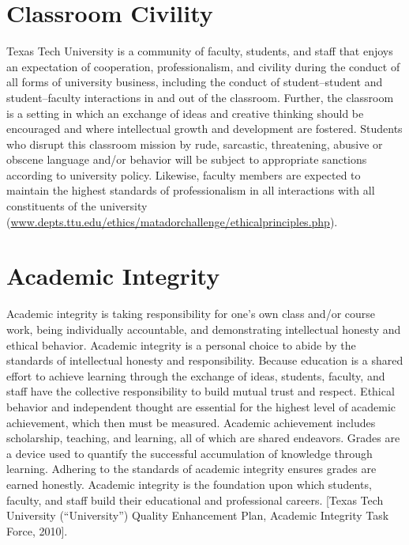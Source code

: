 \documentclass[12pt, notitlepage]{article}   	%
\begin{document}
{\section{Classroom Civility}
Texas Tech University is a community of faculty, students, and staff that
enjoys an expectation of cooperation, professionalism, and civility during
the conduct of all forms of university business, including the conduct of
student–student and student–faculty interactions in and out of the
classroom. Further, the classroom is a setting in which an exchange of ideas
and creative thinking should be encouraged and where intellectual growth
and development are fostered. Students who disrupt this classroom mission
by rude, sarcastic, threatening, abusive or obscene language and/or
behavior will be subject to appropriate sanctions according to university
policy. Likewise, faculty members are expected to maintain the highest
standards of professionalism in all interactions with all constituents of the
university (\url{www.depts.ttu.edu/ethics/matadorchallenge/ethicalprinciples.php}).

\section{Academic Integrity}
Academic integrity is taking responsibility for one's own class and/or course work, being
individually accountable, and demonstrating intellectual honesty and ethical behavior. Academic
integrity is a personal choice to abide by the standards of intellectual honesty and responsibility.
Because education is a shared effort to achieve learning through the exchange of ideas, students,
faculty, and staff have the collective responsibility to build mutual trust and respect. Ethical
behavior and independent thought are essential for the highest level of academic achievement,
which then must be measured. Academic achievement includes scholarship, teaching, and learning,
all of which are shared endeavors. Grades are a device used to quantify the successful
accumulation of knowledge through learning. Adhering to the standards of academic integrity
ensures grades are earned honestly. Academic integrity is the foundation upon which students,
faculty, and staff build their educational and professional careers. [Texas Tech University
(“University”) Quality Enhancement Plan, Academic Integrity Task Force, 2010].

}
\end{document}
